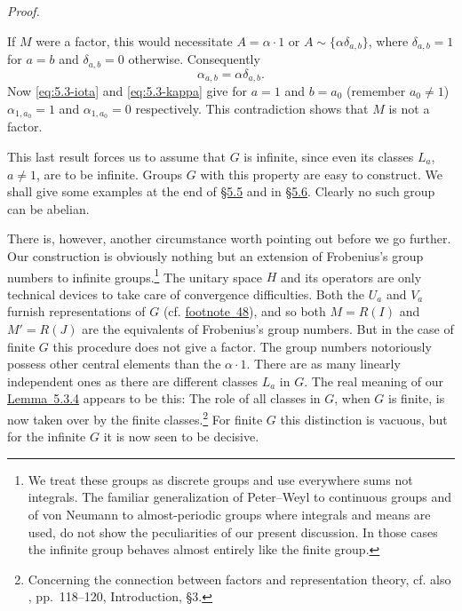 \documentclass[b5paper,twoside]{article}
\newcommand{\secref}[2]{\hyperref[#1]{\mbox{\S#2}}}
\newcommand{\lemref}[2]{\hyperref[#1]{\mbox{Lemma~#2}}}
\theoremstyle{mvnplain}
\renewenvironment{proof}[1][Proof]{%
  \par\addvspace{0.35\baselineskip}%
  \noindent\textit{#1.}\ \normalfont\ignorespaces
}{%
  \par\addvspace{0.35\baselineskip}%
}
\newcommand{\M}{\mathbf M}
\newcommand{\R}{\mathbf R}
\newcommand{\Hilbert}{\mathfrak H}
\def\M{M}%
\def\R{R}%
\def\Hilbert{H}%
\def\mathfrak#1{#1}%
\begin{document}
\begin{proof}
If \(\M\) were a factor, this would necessitate \(A=\alpha\cdot1\) or
\(A\sim\{\alpha\delta_{a,b}\}\), where \(\delta_{a,b}=1\) for \(a=b\)
and \(\delta_{a,b}=0\) otherwise. Consequently
\begin{equation}\tag{5.3.\(\kappa\)}\label{eq:5.3-kappa}
 \alpha_{a,b}=\alpha\delta_{a,b}.
\end{equation}
Now \eqref{eq:5.3-iota} and \eqref{eq:5.3-kappa} give for \(a=1\) and
\(b=a_0\) (remember \(a_0\ne1\)) \(\alpha_{1,a_0}=1\) and
\(\alpha_{1,a_0}=0\) respectively. This contradiction shows that \(\M\) is
not a factor.
\end{proof}

This last result forces us to assume that \(\mathfrak G\) is infinite, since
even its classes \(\mathfrak L_a\), \(a\ne1\), are to be infinite. Groups
\(\mathfrak G\) with this property are easy to construct. We shall give some
examples at the end of \secref{sec:5.5}{5.5} and in
\secref{sec:5.6}{5.6}. Clearly no such group can be abelian.

There is, however, another circumstance worth pointing out before we go
further. Our construction is obviously nothing but an extension of
Frobenius's group numbers to infinite groups.\footnote{We treat these groups
as discrete groups and use everywhere sums not integrals. The familiar
generalization of Peter--Weyl to continuous groups and of von Neumann to
almost-periodic groups where integrals and means are used, do not show the
peculiarities of our present discussion. In those cases the infinite group
behaves almost entirely like the finite group.} The unitary space \(\Hilbert\)
and its operators are only technical devices to take care of convergence
difficulties. Both the \(U_a\) and \(V_a\) furnish representations of
\(\mathfrak G\) (cf. \hyperlink{fn:48}{footnote~48}), and so both \(\M=\R(I)\) and
\(\M'=\R(J)\) are the equivalents of Frobenius's group numbers. But in the
case of finite \(\mathfrak G\) this procedure does not give a factor. The group
numbers notoriously possess other central elements than the \(\alpha\cdot1\).
There are as many linearly independent ones as there are different classes
\(\mathfrak L_a\) in \(\mathfrak G\). The real meaning of our
\lemref{lem:5.3.4}{5.3.4} appears to be this: The role of all classes in
\(\mathfrak G\), when \(\mathfrak G\) is finite, is now taken over by the
finite classes.\footnote{Concerning the connection between factors and
representation theory, cf. also \cite{ref5}, pp.~118--120,
Introduction, \S3.} For finite \(\mathfrak G\) this distinction is vacuous,
but for the infinite \(\mathfrak G\) it is now seen to be decisive.
\end{document}
